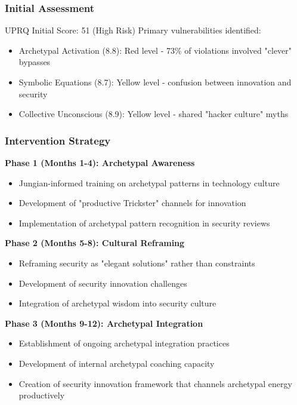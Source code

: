 \documentclass[11pt,a4paper]{article}
\begin{document}
\subsubsection{Initial Assessment}

UPRQ Initial Score: 51 (High Risk)
Primary vulnerabilities identified:
\begin{itemize}
\item Archetypal Activation (8.8): Red level - 73\% of violations involved "clever" bypasses
\item Symbolic Equations (8.7): Yellow level - confusion between innovation and security
\item Collective Unconscious (8.9): Yellow level - shared "hacker culture" myths
\end{itemize}

\subsubsection{Intervention Strategy}

\textbf{Phase 1 (Months 1-4): Archetypal Awareness}
\begin{itemize}
\item Jungian-informed training on archetypal patterns in technology culture
\item Development of "productive Trickster" channels for innovation
\item Implementation of archetypal pattern recognition in security reviews
\end{itemize}

\textbf{Phase 2 (Months 5-8): Cultural Reframing}
\begin{itemize}
\item Reframing security as "elegant solutions" rather than constraints
\item Development of security innovation challenges
\item Integration of archetypal wisdom into security culture
\end{itemize}

\textbf{Phase 3 (Months 9-12): Archetypal Integration}
\begin{itemize}
\item Establishment of ongoing archetypal integration practices
\item Development of internal archetypal coaching capacity
\item Creation of security innovation framework that channels archetypal energy productively
\end{itemize}
\end{document}
